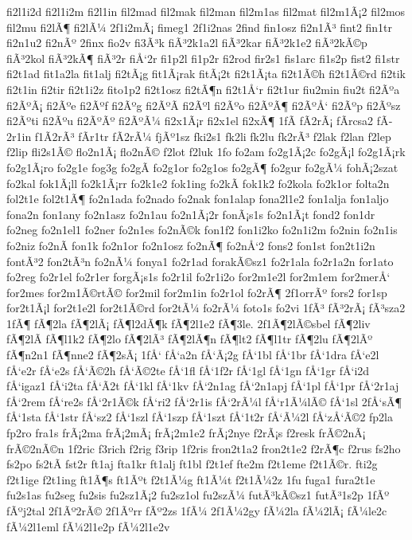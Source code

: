 {fi2l1i2d
fi2l1i2m
fi2l1in
fil2mad
fil2mak
fil2man
fil2m1as
fil2mat
fil2m1Ã¡2
fil2mos
fil2mu
fi2lÃ¶
fi2lÃ¼
2f1i2mÃ¡
fimeg1
2f1i2nas
2find
fin1osz
fi2n1Ã³
fint2
fin1tr
fi2n1u2
fi2nÃº
2finx
fio2v
fi3Ã³k
fiÃ³2k1a2l
fiÃ³2kar
fiÃ³2k1e2
fiÃ³2kÃ©p
fiÃ³2kol
fiÃ³2kÃ¶
fiÃ³2r
fiÅ‘2r
fi1p2l
fi1p2r
fi2rod
fir2s1
fis1arc
fi1s2p
fist2
fi1str
fi2t1ad
fit1a2la
fit1alj
fi2tÃ¡g
fit1Ã¡rak
fitÃ¡2t
fi2t1Ã¡ta
fi2t1Ã©h
fi2t1Ã©rd
fi2tik
fi2t1in
fi2tir
fi2t1i2z
fito1p2
fi2t1osz
fi2tÃ¶n
fi2t1Å‘r
fi2t1ur
fiu2min
fiu2t
fi2Ãºa
fi2ÃºÃ¡
fi2Ãºe
fi2Ãºf
fi2Ãºg
fi2ÃºÃ­
fi2Ãºl
fi2Ãºo
fi2ÃºÃ¶
fi2ÃºÅ‘
fi2Ãºp
fi2Ãºsz
fi2Ãºti
fi2Ãºu
fi2ÃºÃº
fi2ÃºÃ¼
fi2x1Ã¡r
fi2x1el
fi2xÃ¶
1fÃ­
fÃ­2rÃ¡
fÃ­rcsa2
fÃ­2r1in
f1Ã­2rÃ³
fÃ­r1tr
fÃ­2rÃ¼
fjÃº1sz
fki2s1
fk2li
fk2lu
fk2rÃ³
f2lak
f2lan
f2lep
f2lip
fli2s1Ã©
flo2n1Ã¡
flo2nÃ©
f2lot
f2luk
1fo
fo2am
fo2g1Ã¡2c
fo2gÃ¡l
fo2g1Ã¡rk
fo2g1Ã¡ro
fo2g1e
fog3g
fo2gÃ­
fo2g1or
fo2g1os
fo2gÃ¶
fo2gur
fo2gÃ¼
fohÃ¡2szat
fo2kal
fok1Ã¡ll
fo2k1Ã¡rr
fo2k1e2
fok1ing
fo2kÃ­
fok1k2
fo2kola
fo2k1or
folta2n
fol2t1e
fol2t1Ã¶
fo2n1ada
fo2nado
fo2nak
fon1alap
fona2l1e2
fon1alja
fon1aljo
fona2n
fon1any
fo2n1asz
fo2n1au
fo2n1Ã¡2r
fonÃ¡s1s
fo2n1Ã¡t
fond2
fon1dr
fo2neg
fo2n1el1
fo2ner
fo2n1es
fo2nÃ©k
fon1f2
fon1i2ko
fo2n1i2m
fo2nin
fo2n1is
fo2niz
fo2nÃ­
fon1k
fo2n1or
fo2n1osz
fo2nÃ¶
fo2nÅ‘2
fons2
fon1st
fon2t1i2n
fontÃ³2
fon2tÃ³n
fo2nÃ¼
fonya1
fo2r1ad
forakÃ©sz1
fo2r1ala
fo2r1a2n
for1ato
fo2reg
fo2r1el
fo2r1er
forgÃ¡s1s
fo2r1il
fo2r1i2o
for2m1e2l
for2m1em
for2merÅ‘
for2mes
for2m1Ã©rtÃ©
for2mil
for2m1in
fo2r1ol
fo2rÃ¶
2f1orrÃº
fors2
for1sp
for2t1Ã¡l
for2t1e2l
for2t1Ã©rd
for2tÃ¼
fo2rÃ¼
foto1s
fo2vi
1fÃ³
fÃ³2rÃ¡
fÃ³sza2
1fÃ¶
fÃ¶2la
fÃ¶2lÃ¡
fÃ¶l2dÃ¶k
fÃ¶2l1e2
fÃ¶3le.
2f1Ã¶2lÃ©sbel
fÃ¶2liv
fÃ¶2lÃ­
fÃ¶l1k2
fÃ¶2lo
fÃ¶2lÃ³
fÃ¶2lÃ¶n
fÃ¶lt2
fÃ¶l1tr
fÃ¶2lu
fÃ¶2lÃº
fÃ¶n2n1
fÃ¶nne2
fÃ¶2sÃ¡
1fÅ‘
fÅ‘a2n
fÅ‘Ã¡2g
fÅ‘1bl
fÅ‘1br
fÅ‘1dra
fÅ‘e2l
fÅ‘e2r
fÅ‘e2s
fÅ‘Ã©2h
fÅ‘Ã©2te
fÅ‘1fl
fÅ‘1f2r
fÅ‘1gl
fÅ‘1gn
fÅ‘1gr
fÅ‘i2d
fÅ‘igaz1
fÅ‘i2ta
fÅ‘Ã­2t
fÅ‘1kl
fÅ‘1kv
fÅ‘2n1ag
fÅ‘2n1apj
fÅ‘1pl
fÅ‘1pr
fÅ‘2r1aj
fÅ‘2rem
fÅ‘re2s
fÅ‘2r1Ã©k
fÅ‘ri2
fÅ‘2r1is
fÅ‘2rÃ¼l
fÅ‘r1Ã¼lÃ©
fÅ‘1sl
2fÅ‘sÃ¶
fÅ‘1sta
fÅ‘1str
fÅ‘sz2
fÅ‘1szl
fÅ‘1szp
fÅ‘1szt
fÅ‘1t2r
fÅ‘Ã¼2l
fÅ‘zÅ‘Ã©2
fp2la
fp2ro
fra1s
frÃ¡2ma
frÃ¡2mÃ¡
frÃ¡2m1e2
frÃ¡2nye
f2rÃ¡s
f2resk
frÃ©2nÃ¡
frÃ©2nÃ©n
1f2ric
f3rich
f2rig
f3rip
1f2ris
fron2t1a2
fron2t1e2
f2rÃ¶c
f2rus
fs2ho
fs2po
fs2tÃ­
fst2r
ft1aj
fta1kr
ft1alj
ft1bl
f2t1ef
fte2m
f2t1eme
f2t1Ã©r.
fti2g
f2t1ige
f2t1ing
ft1Ã¶s
ft1Ãºt
f2t1Ã¼g
ft1Ã¼t
f2t1Ã¼2z
1fu
fuga1
fura2t1e
fu2s1as
fu2seg
fu2sis
fu2sz1Ã¡2
fu2sz1ol
fu2szÃ¼
futÃ³kÃ©sz1
futÃ³1s2p
1fÃº
fÃºj2tal
2f1Ãº2rÃ©
2f1Ãºrr
fÃº2zs
1fÃ¼
2f1Ã¼2gy
fÃ¼2la
fÃ¼2lÃ¡
fÃ¼le2c
fÃ¼2l1eml
fÃ¼2l1e2p
fÃ¼2l1e2v
}
